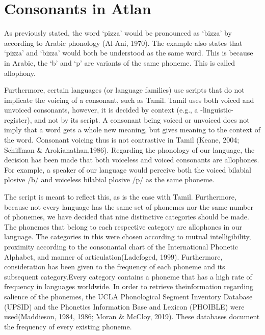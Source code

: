 \section{Consonants in Atlan}
As previously stated, the word ‘pizza’ would be pronounced as ‘bizza’ by according to Arabic phonology (Al-Ani, 1970). The example also states that ‘pizza’ and ‘bizza’ would both be understood as the same word. This is because in Arabic, the ‘b’ and ‘p’ are variants of the same phoneme. This is called allophony. 

Furthermore, certain languages (or language families) use scripts that do not implicate the voicing of a consonant, such as Tamil. Tamil uses both voiced and unvoiced consonants, however, it is decided by context (e.g., a -linguistic- register), and not by its script. A consonant being voiced or unvoiced does not imply that a word gets a whole new meaning, but gives meaning to the context of the word. Consonant voicing thus is not contrastive in Tamil (Keane, 2004; Schiffman \& Arokianathan,1986). Regarding the phonology of our language, the decision has been made that both voiceless and voiced consonants are allophones. For example, a speaker of our language would perceive both the voiced bilabial plosive /b/ and voiceless bilabial plosive /p/ as the same phoneme.  

The script is meant to reflect this, as is the case with Tamil. Furthermore, because not every language has the same set of phonemes nor the same number of phonemes, we have decided that nine distinctive categories should be made. The phonemes that belong to each respective category are allophones in our language. The categories in this were chosen according to mutual intelligibility, proximity according to the consonantal chart of the International Phonetic Alphabet, and manner of articulation(Ladefoged, 1999). Furthermore, consideration has been given to the frequency of each phoneme and its subsequent category.Every category contains a phoneme that has a high rate of frequency in languages worldwide. In order to retrieve theinformation regarding salience of the phonemes, the UCLA Phonological Segment Inventory Database (UPSID) and the Phonetics Information Base and Lexicon (PHOIBLE) were used(Maddieson, 1984, 1986; Moran \& McCloy, 2019). These databases document the frequency of every existing phoneme. 

